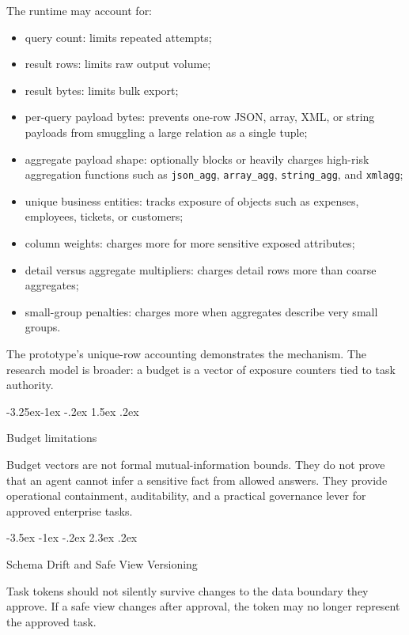 \documentclass[10pt,twocolumn]{article}
\makeatletter
\providecommand{\tightlist}{%
  \setlength{\itemsep}{0pt}\setlength{\parskip}{0pt}}
\renewcommand\section{\@startsection{section}{1}{\z@}%
  {-3.5ex \@plus -1ex \@minus -.2ex}%
  {2.3ex \@plus .2ex}%
  {\normalfont\Large\bfseries\raggedright}}
\renewcommand\subsection{\@startsection{subsection}{2}{\z@}%
  {-3.25ex\@plus -1ex \@minus -.2ex}%
  {1.5ex \@plus .2ex}%
  {\normalfont\large\bfseries\raggedright}}
\makeatother
\begin{document}
The runtime may account for:

\begin{itemize}
\tightlist
\item
  query count: limits repeated attempts;
\item
  result rows: limits raw output volume;
\item
  result bytes: limits bulk export;
\item
  per-query payload bytes: prevents one-row JSON, array, XML,
  or string payloads from smuggling a large relation as a single tuple;
\item
  aggregate payload shape: optionally blocks or heavily charges
  high-risk aggregation functions such as \texttt{json\_agg},
  \texttt{array\_agg}, \texttt{string\_agg}, and \texttt{xmlagg};
\item
  unique business entities: tracks exposure of objects such as
  expenses, employees, tickets, or customers;
\item
  column weights: charges more for more sensitive exposed
  attributes;
\item
  detail versus aggregate multipliers: charges detail rows more
  than coarse aggregates;
\item
  small-group penalties: charges more when aggregates describe
  very small groups.
\end{itemize}

The prototype's unique-row accounting demonstrates the mechanism. The
research model is broader: a budget is a vector of exposure counters
tied to task authority.

\hypertarget{budget-limitations}{%
\subsection{Budget limitations}\label{budget-limitations}}

Budget vectors are not formal mutual-information bounds. They do not
prove that an agent cannot infer a sensitive fact from allowed answers.
They provide operational containment, auditability, and a practical
governance lever for approved enterprise tasks.


\hypertarget{schema-drift-and-safe-view-versioning}{%
\section{Schema Drift and Safe View
Versioning}\label{schema-drift-and-safe-view-versioning}}

Task tokens should not silently survive changes to the data boundary
they approve. If a safe view changes after approval, the token may no
longer represent the approved task.
\end{document}

